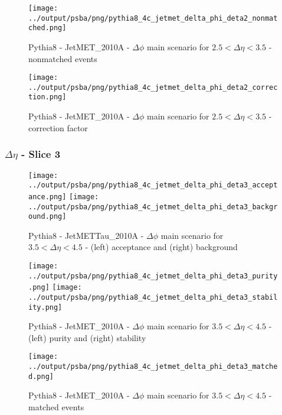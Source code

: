 \documentclass[11pt]{book}
\begin{document}
\begin{figure}[ht]
\centering
\texttt{[image: ../output/psba/png/pythia8\_4c\_jetmet\_delta\_phi\_deta2\_nonmatched.png]}
\caption{Pythia8 - JetMET\_2010A - $\Delta\phi$ main scenario for $2.5 < \Delta\eta < 3.5$ - nonmatched events}
\label{fig:p8_jetmet_delta_phi_deta2_nonmatched}
\end{figure}

\begin{figure}[ht]
\centering
\texttt{[image: ../output/psba/png/pythia8\_4c\_jetmet\_delta\_phi\_deta2\_correction.png]}
\caption{Pythia8 - JetMET\_2010A - $\Delta\phi$ main scenario for $2.5 < \Delta\eta < 3.5$ - correction factor}
\label{fig:p8_jetmet_delta_phi_deta2_correction}
\end{figure}

\clearpage
\subsubsection{$\Delta\eta$ - Slice 3}

\begin{figure}[ht]
\centering
\texttt{[image: ../output/psba/png/pythia8\_4c\_jetmet\_delta\_phi\_deta3\_acceptance.png]}
\texttt{[image: ../output/psba/png/pythia8\_4c\_jetmet\_delta\_phi\_deta3\_background.png]}
\caption{Pythia8 - JetMETTau\_2010A - $\Delta\phi$ main scenario for $3.5 < \Delta\eta < 4.5$ - (left) acceptance and (right) background}
\label{fig:p8_jetmet_delta_phi_deta3_ab}
\end{figure}

\begin{figure}[ht]
\centering
\texttt{[image: ../output/psba/png/pythia8\_4c\_jetmet\_delta\_phi\_deta3\_purity.png]}
\texttt{[image: ../output/psba/png/pythia8\_4c\_jetmet\_delta\_phi\_deta3\_stability.png]}
\caption{Pythia8 - JetMET\_2010A - $\Delta\phi$ main scenario for $3.5 < \Delta\eta < 4.5$ - (left) purity and (right) stability}
\label{fig:p6_jetmet_delta_phi_deta3_ps}
\end{figure}

\begin{figure}[ht]
\centering
\texttt{[image: ../output/psba/png/pythia8\_4c\_jetmet\_delta\_phi\_deta3\_matched.png]}
\caption{Pythia8 - JetMET\_2010A - $\Delta\phi$ main scenario for $3.5 < \Delta\eta < 4.5$ - matched events}
\label{fig:p8_jetmet_delta_phi_deta3_matched}
\end{figure}
\end{document}

